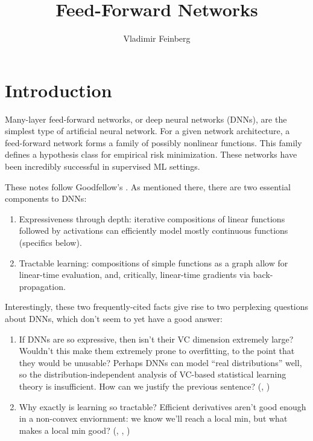 \documentclass{article}
\title{Feed-Forward Networks}
\author{Vladimir Feinberg}
\begin{document}
\maketitle

\section{Introduction}

Many-layer feed-forward networks, or deep neural networks (DNNs), are the simplest type of artificial neural network. For a given network architecture, a feed-forward network forms a family of possibly nonlinear functions. This family defines a hypothesis class for empirical risk minimization. These networks have been incredibly successful in supervised ML settings.

These notes follow Goodfellow's . As mentioned there, there are two essential components to DNNs:
\begin{enumerate}
\item Expressiveness through depth: iterative compositions of linear functions followed by activations can efficiently model mostly continuous functions (specifics below).
\item Tractable learning: compositions of simple functions as a graph allow for linear-time evaluation, and, critically, linear-time gradients via back-propagation.
\end{enumerate}

Interestingly, these two frequently-cited facts give rise to two perplexing questions about DNNs, which don't seem to yet have a good answer:
\begin{enumerate}
\item If DNNs are so expressive, then isn't their VC dimension extremely large? Wouldn't this make them extremely prone to overfitting, to the point that they would be unusable? Perhaps DNNs can model ``real distributions'' well, so the distribution-independent analysis of VC-based statistical learning theory is insufficient. How can we justify the previous sentence? (, )
\item Why exactly is learning so tractable? Efficient derivatives aren't good enough in a non-convex enviornment: we know we'll reach a local min, but what makes a local min good? (, , )
\end{enumerate}
\end{document}
